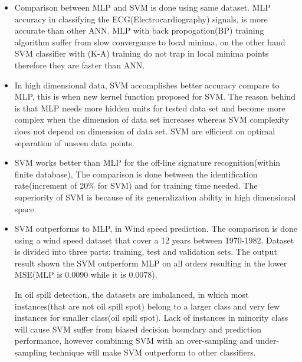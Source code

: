 
\begin{itemize}
	
	

	\item Comparison between MLP and SVM is done using same dataset. MLP accuracy in classifying the ECG(Electrocardiography) signals, is more accurate than other ANN. MLP with back propogation(BP) training algorithm suffer from slow convergance to local minima, on the other hand SVM classifier with (K-A) training do not trap in local minima points therefore they are faster than ANN. \cite{Moavenian20103088}
	\item  In high dimensional data, SVM accomplishes better accuracy compare to MLP, this is when new kernel function proposed for SVM. The reason behind is that MLP needs more hidden units for tested data set and become more complex when the dimension of data set increases whereas SVM complexity does not depend on dimension of data set. SVM are efficient on optimal separation of unseen data points.\cite{Zanaty2012177}
	\item SVM works better than MLP for the off-line signature recognition(within finite database), The comparison is done between the identification rate(increment of 20\% for SVM) and for training time needed. The superiority of SVM is because of its generalization ability in high dimensional space\cite{FriasMartinez2006693}.

	\item SVM outperforms to MLP, in Wind speed prediction. The comparison is done using a wind speed dataset that cover a 12 years between 1970-1982. Dataset is divided into three parts: training, test and validation sets. The output result shown the SVM outperform MLP on all orders resulting in the lower MSE(MLP is 0.0090 while it is 0.0078)\cite{Mohandes2004939}.

	In oil spill detection, the datasets are imbalanced, in which most instances(that are not oil spill spot) belong to a larger class and very few instances for smaller class(oil spill spot). Lack of instances in minority class will cause SVM suffer from biased decision boundary and prediction performance, however combining SVM with an over-sampling and under-sampling technique will make SVM outperform to other classifiers\cite{liu2006boosting}.

	
      

\end{itemize}



	